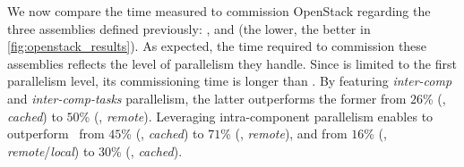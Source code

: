 We now compare the time measured to commission OpenStack regarding the three
assemblies defined previously: \ansass, \aeoass and \madass (the lower, the
better in \cref{fig:openstack_results}).
As expected, the time required to commission these assemblies reflects
the level of parallelism they handle. Since \ansass is limited to the
first parallelism level, its commissioning time is longer than
\aeoass. By featuring \emph{inter-comp} and \emph{inter-comp-tasks}
parallelism, the latter outperforms the former from $26$\% (\nova,
\emph{cached}) to $50$\% (\ecotype, \emph{remote}). Leveraging
intra-component parallelism enables \madass to outperform \ansass~from
$45$\% (\nova, \emph{cached}) to $71$\% (\ecotype, \emph{remote}), and
\aeoass from $16$\% (\nova, \emph{remote}/\emph{local}) to $30$\%
(\ecotype, \emph{cached}).

